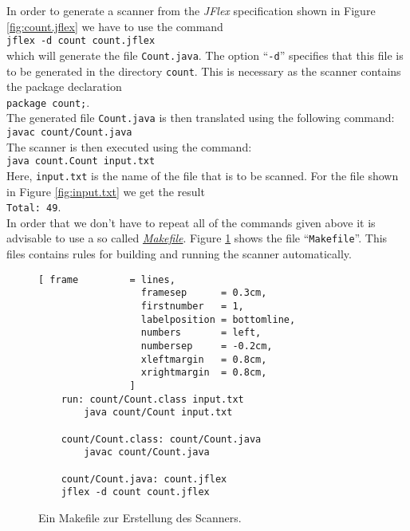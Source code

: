 In order to generate a scanner from the \textsl{JFlex} specification shown in Figure
\ref{fig:count.jflex} we have to use the  command
\\[0.2cm]
\hspace*{1.3cm}
\texttt{jflex -d count count.jflex}
\\[0.2cm]
which will generate the file \texttt{Count.java}.  The option  ``\texttt{-d}'' specifies that this
file is to be generated in the directory  \texttt{count}.  This is necessary as the scanner contains
the package declaration 
\\[0.2cm]
\hspace*{1.3cm}
\texttt{package count;}.
\\[0.2cm] 
The generated file \texttt{Count.java} is then translated using the following command:
\\[0.2cm]
\hspace*{1.3cm}
\texttt{javac count/Count.java}
\\[0.2cm]
The scanner is then executed using the command:
\\[0.2cm]
\hspace*{1.3cm}
\texttt{java count.Count input.txt}
\\[0.2cm]
Here,  \texttt{input.txt} is the name of the file that is to be scanned.   For the file shown in Figure
\ref{fig:input.txt} we get the result
\\[0.2cm]
\hspace*{1.3cm}
\texttt{Total: 49}.
\\[0.2cm]
In order that we don't have to repeat all of the commands given above it is advisable to use a so
called \href{http://en.wikipedia.org/wiki/Make_(software)}{\textsl{Makefile}}.
Figure \ref{fig:count-makefile} shows the file ``\texttt{Makefile}''.  This files contains rules for
building and running the scanner automatically.


\begin{figure}[!ht]
\centering
\begin{Verbatim}[ frame         = lines, 
                  framesep      = 0.3cm, 
                  firstnumber   = 1,
                  labelposition = bottomline,
                  numbers       = left,
                  numbersep     = -0.2cm,
                  xleftmargin   = 0.8cm,
                  xrightmargin  = 0.8cm,
                ]
    run: count/Count.class input.txt
    	java count/Count input.txt
    
    count/Count.class: count/Count.java
    	javac count/Count.java
    
    count/Count.java: count.jflex
	jflex -d count count.jflex
\end{Verbatim}
\vspace*{-0.3cm}
\caption{Ein Makefile zur Erstellung des Scanners.}
\label{fig:count-makefile}
\end{figure}

